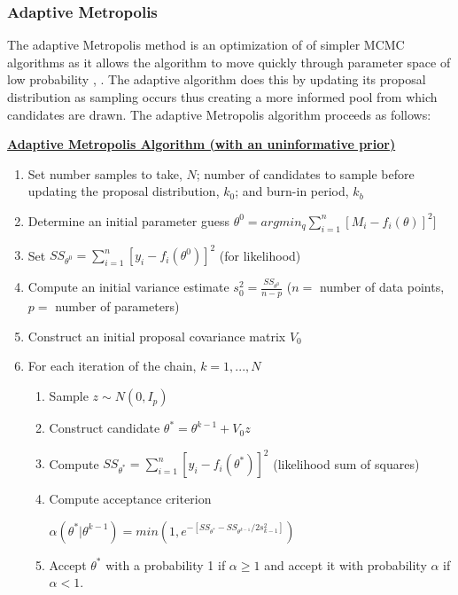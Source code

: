 \subsubsection{Adaptive Metropolis}
The adaptive Metropolis method is an optimization of of simpler MCMC algorithms as it allows the algorithm to move quickly through parameter space of low probability \cite{collis}, \cite{adaptive_andrieu}. The adaptive algorithm does this by updating its proposal distribution as sampling occurs thus creating a more informed pool from which candidates are drawn. The adaptive Metropolis algorithm proceeds as follows:
\begin{tcolorbox} \label{box:am}
\textbf{\underline{Adaptive Metropolis Algorithm (with an uninformative prior)}}
\begin{enumerate}
\item Set number samples to take, $N$; number of candidates to sample before updating the proposal distribution, $k_0$; and burn-in period, $k_b$
    \item Determine an initial parameter guess $\theta^0 = argmin_q \sum_{i=1}^{n}[M_i - f_i(\theta)]^2]$
    \item Set $SS_{\theta^0} = \sum_{i = 1}^{n}[y_i - f_i(\theta^0)]^2$ (for likelihood)
    \item Compute an initial variance estimate $s_0^2 = \frac{SS_{\theta^0}}{n-p}$ ($n =$ number of data points, $p = $ number of parameters)
    \item Construct an initial proposal covariance matrix $V_0$ 
    \item For each iteration of the chain, $k = 1,...,N$
    \begin{enumerate}
        \item Sample $z \sim N(0,I_p)$
        \item Construct candidate $\theta^* = \theta^{k-1}+ V_0z$
        \item Compute $SS_{\theta^*} = \sum_{i = 1}^{n}[y_i - f_i(\theta^*)]^2$ (likelihood sum of squares)
        \item Compute acceptance criterion
            \begin{center}
                $\alpha(\theta^* | \theta^{k-1}) = min(1, e^{-[SS_{\theta^*}-SS_{\theta^{k-1}}/2s_{k-1}^2]})$
            \end{center}
        \item Accept $\theta^*$ with a probability 1 if $\alpha \geq 1$ and accept it with probability $\alpha$ if $\alpha < 1$.
        \begin{itemize}

\end{itemize}
\end{enumerate}
\end{enumerate}
\end{tcolorbox}
